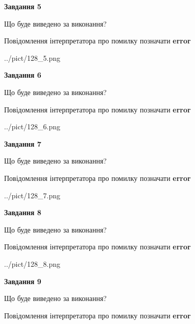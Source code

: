 \documentclass[11pt, ukrainian]{article}
\begin{document}
{\begin {large}
{\begin {center}\textbf{Завдання 5}\end {center}}\par
Що буде виведено за виконання? \par
Повідомлення інтерпретатора про помилку позначати \textbf{error}

\begin{center}
	{../pict/128_5.png}
\end{center}
\newpage

{\begin {center}\textbf{Завдання 6}\end {center}}\par
Що буде виведено за виконання? \par
Повідомлення інтерпретатора про помилку позначати \textbf{error}

\begin{center}
	{../pict/128_6.png}
\end{center}
\newpage

{\begin {center}\textbf{Завдання 7}\end {center}}\par
Що буде виведено за виконання? \par
Повідомлення інтерпретатора про помилку позначати \textbf{error}

\begin{center}
	{../pict/128_7.png}
\end{center}
\newpage

{\begin {center}\textbf{Завдання 8}\end {center}}\par
Що буде виведено за виконання? \par
Повідомлення інтерпретатора про помилку позначати \textbf{error}

\begin{center}
	{../pict/128_8.png}
\end{center}
\newpage

{\begin {center}\textbf{Завдання 9}\end {center}}\par
Що буде виведено за виконання? \par
Повідомлення інтерпретатора про помилку позначати \textbf{error}


\end{large}}
\end{document}
